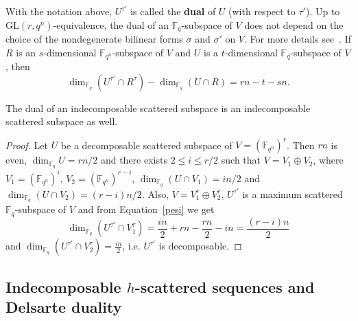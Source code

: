 	With the notation above, $U^{\tau '}$ is called the \textbf{dual} of $U$ (with respect to $\tau'$). 
	Up to $\mathrm{GL}(r,q^n)$-equivalence, the dual of an $\mathbb{F}_q$-subspace of $V$ does not depend on the choice of the nondegenerate bilinear forms $\sigma$ and $\sigma'$ on $V$. For more details see~\cite{polverino2010linear}. If $R$ is an $s$-dimensional ${\mathbb F}_{q^n}$-subspace of $V$ and $U$ is a $t$-dimensional $\mathbb{F}_q$-subspace of $V$, then
	\begin{equation}\label{pesi}
		\dim_{\mathbb{F}_q}(U^{\tau'}\cap R^\tau)-\dim_{\mathbb{F}_q}(U\cap R)=rn-t-sn.
	\end{equation}
	
	\begin{prop}
	The dual of an indecomposable scattered subspace is an indecomposable scattered subspace as well.
	\end{prop}
	
	\begin{proof}
	Let $U$ be a decomposable scattered subspace of $V=(\mathbb{F}_{q^n})^{r}$. Then $rn$ is even, $\dim_{\mathbb{F}_q} U=rn/2$ and there exists $2\leq i\leq r/2$ such that $V=V_1\oplus V_2$, where $V_1=(\mathbb{F}_{q^n})^{i}$, $V_2=(\mathbb{F}_{q^n})^{r-i}$, $\dim_{\mathbb{F}_q}(U\cap V_1)=in/2$ and $\dim_{\mathbb{F}_q}(U\cap V_2)=(r-i)n/2$. Also, $V=V_1^\tau\oplus V_2^\tau$, $U^{\tau'}$ is a maximum scattered $\mathbb{F}_q$-subspace of $V$ and from Equation~\eqref{pesi} we get
	\[\dim_{\mathbb{F}_q} (U^{\tau'}\cap V_1^{\tau})=\frac{in}{2}+rn-\frac{rn}{2}-in=\frac{(r-i)n}{2}\]
    and $\dim_{\mathbb{F}_q}(U^{\tau '}\cap V_2^\tau)=\frac{in}{2}$, i.e. $U^{\tau'}$ is decomposable.
	\end{proof}
	
\subsection{Indecomposable \texorpdfstring{$h$}{h}-scattered sequences and Delsarte duality}

